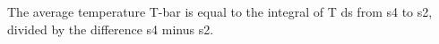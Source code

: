 The average temperature T-bar is equal to the integral of T ds from s4 to s2, divided by the difference s4 minus s2.